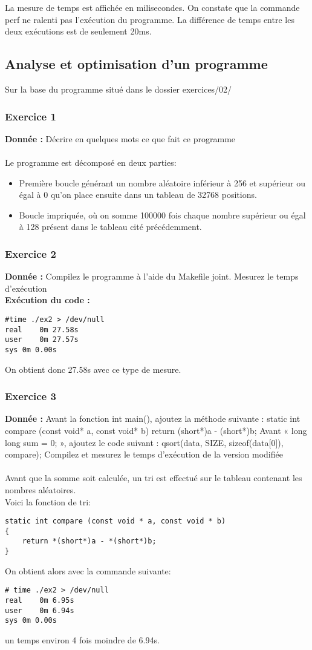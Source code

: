 La mesure de temps est affichée en milisecondes. On constate que la commande perf ne ralenti pas l'exécution du programme. La différence de temps entre les deux exécutions est de seulement 20ms.

\subsection{Analyse et optimisation d'un programme}
Sur	la	base	du	programme	situé	dans	le	dossier	exercices/02/
\subsubsection{Exercice 1}
\textbf{Donnée : } Décrire	en	quelques	mots	ce	que	fait	ce	programme\\\\
Le programme est décomposé en deux parties:
\begin{itemize}
\item Première boucle générant un nombre aléatoire inférieur à 256 et supérieur ou égal à 0 qu'on place ensuite dans un tableau de 32768 positions.
\item Boucle impriquée, où on somme 100000 fois chaque nombre supérieur ou égal à 128 présent dans le tableau cité précédemment.
\end{itemize}
\subsubsection{Exercice 2}
\textbf{Donnée : } Compilez	le	programme	à	l'aide	du	Makefile	joint.
Mesurez	le	temps	d'exécution\\

\textbf{Exécution du code : } \\
\begin{lstlisting}
#time ./ex2 > /dev/null
real    0m 27.58s
user    0m 27.57s
sys 0m 0.00s
\end{lstlisting}
On obtient donc 27.58s avec ce type de mesure.
\subsubsection{Exercice 3}
\textbf{Donnée : } Avant	la	fonction	int	main(),	ajoutez	la	méthode	suivante :
static int compare (const void* a, const void* b)
{return (short*)a - (short*)b;}
Avant	« long	long	sum	=	0; »,	ajoutez	le	code	suivant :
qsort(data, SIZE, sizeof(data[0]), compare);
Compilez	et	mesurez	le	temps	d'exécution	de	la	version	modifiée\\\\
Avant que la somme soit calculée, un tri est effectué sur le tableau contenant les nombres aléatoires.\\
Voici la fonction de tri:
\begin{lstlisting}
static int compare (const void * a, const void * b)
{
    return *(short*)a - *(short*)b;
}
\end{lstlisting}
On obtient alors avec la commande suivante:
\begin{lstlisting}
# time ./ex2 > /dev/null 
real    0m 6.95s
user    0m 6.94s
sys 0m 0.00s
\end{lstlisting}
un temps environ 4 fois moindre de 6.94s.

